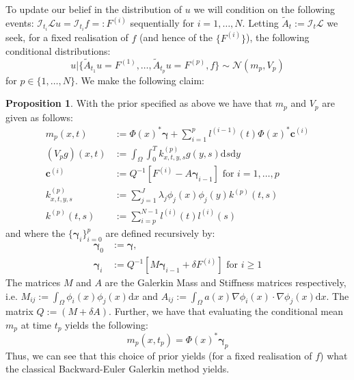 \documentclass{article}
\theoremstyle{definition}
\newtheorem{proposition}{Proposition}[section]
\theoremstyle{remark}
\theoremstyle{remark}
\begin{document}
To update our belief in the distribution of $u$ we will condition on the following events: $\mathcal{I}_{t_{i}}\mathcal{L}u=\mathcal{I}_{t_{i}}f=:F^{(i)}$ sequentially for $i=1,\dots,N$. Letting $\tilde{A}_{t}:=\mathcal{I}_{t}\mathcal{L}$ we seek, for a fixed realisation of $f$ (and hence of the $\{F^{(i)}\}$), the following conditional distributions:
\begin{equation}
    u|\{\tilde{A}_{t_{1}}u=F^{(1)},\dots,\tilde{A}_{t_{p}}u=F^{(p)},f\}\sim\mathcal{N}(m_{p},V_{p})
\end{equation}
for $p\in\{1,\dots,N\}$. We make the following claim:
\begin{proposition}
    With the prior specified as above we have that $m_{p}$ and $V_{p}$ are given as follows:
    \begin{align}
        m_{p}(x,t) &:= \Phi(x)^{*}\boldsymbol{\gamma} + \sum_{i=1}^{p}l^{(i-1)}(t)\Phi(x)^{*}\boldsymbol{c}^{(i)} \\
        (V_{p}g)(x,t) &:= \int_{\Omega}\int_{0}^{T}k^{(p)}_{x,t,y,s}g(y,s)\mathrm{d}s\mathrm{d}y \\
        \boldsymbol{c}^{(i)} &:= Q^{-1}\left[F^{(i)}-A\boldsymbol{\gamma}_{i-1}\right] \text{ for } i=1,\dots,p \\
        k^{(p)}_{x,t,y,s} &:= \sum_{j=1}^{J}\lambda_{j}\phi_{j}(x)\phi_{j}(y)k^{(p)}(t,s) \\
        k^{(p)}(t,s) &:= \sum_{i=p}^{N-1}l^{(i)}(t)l^{(i)}(s)
    \end{align}
    and where the $\{\boldsymbol{\gamma}_{i}\}_{i=0}^{p}$ are defined recursively by:
    \begin{align}
        \boldsymbol{\gamma}_{0} &:= \boldsymbol{\gamma}, \\
        \boldsymbol{\gamma}_{i} &:= Q^{-1}\left[M\boldsymbol{\gamma}_{i-1}+\delta F^{(i)}\right] \text{ for } i\geq 1
    \end{align}
    The matrices $M$ and $A$ are the Galerkin Mass and Stiffness matrices respectively, i.e. $M_{ij}:=\int_{\Omega}\phi_{i}(x)\phi_{j}(x)\mathrm{d}x$ and $A_{ij}:=\int_{\Omega}a(x)\nabla\phi_{i}(x)\cdot\nabla\phi_{j}(x)\mathrm{d}x$. The matrix $Q:=(M+\delta A)$. Further, we have that evaluating the conditional mean $m_{p}$ at time $t_p$ yields the following:
    \begin{equation}
        m_{p}(x,t_p) = \Phi(x)^{*}\boldsymbol{\gamma}_{p}
    \end{equation}
    Thus, we can see that this choice of prior yields (for a fixed realisation of $f$) what the classical Backward-Euler Galerkin method yields.
\end{proposition}
\end{document}
